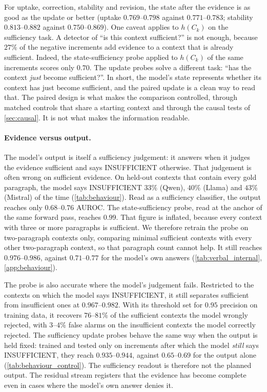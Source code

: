 For uptake, correction, stability and revision, the state after the evidence is as good as the update or better (uptake $0.769$--$0.798$ against $0.771$--$0.783$; stability $0.813$--$0.882$ against $0.750$--$0.869$). One caveat applies to $h(C_k)$ on the sufficiency task. A detector of ``is this context sufficient?'' is not enough, because $27\%$ of the negative increments add evidence to a context that is already sufficient. Indeed, the state-sufficiency probe applied to $h(C_k)$ of the same increments scores only $0.70$. The update probes solve a different task: ``has the context \emph{just} become sufficient?''. In short, the model's state represents whether its context has just become sufficient, and the paired update is a clean way to read that. The paired design is what makes the comparison controlled, through matched controls that share a starting context and through the causal tests of \cref{sec:causal}. It is not what makes the information readable.

\paragraph{Evidence versus output.}
The model's output is itself a sufficiency judgement: it answers when it judges the evidence sufficient and says INSUFFICIENT otherwise. That judgement is often wrong on sufficient evidence. On held-out contexts that contain every gold paragraph, the model says INSUFFICIENT $33\%$ (Qwen), $40\%$ (Llama) and $43\%$ (Mistral) of the time (\cref{tab:behaviour}). Read as a sufficiency classifier, the output reaches only $0.68$--$0.76$ AUROC. The state-sufficiency probe, read at the anchor of the same forward pass, reaches $0.99$. That figure is inflated, because every context with three or more paragraphs is sufficient. We therefore retrain the probe on two-paragraph contexts only, comparing minimal sufficient contexts with every other two-paragraph context, so that paragraph count cannot help. It still reaches $0.976$--$0.986$, against $0.71$--$0.77$ for the model's own answers (\cref{tab:verbal_internal}, \cref{app:behaviour}).

The probe is also accurate where the model's judgement fails. Restricted to the contexts on which the model says INSUFFICIENT, it still separates sufficient from insufficient ones at $0.967$--$0.982$. With its threshold set for $0.95$ precision on training data, it recovers $76$--$81\%$ of the sufficient contexts the model wrongly rejected, with $3$--$4\%$ false alarms on the insufficient contexts the model correctly rejected. The sufficiency update probes behave the same way when the output is held fixed: trained and tested only on increments after which the model \emph{still} says INSUFFICIENT, they reach $0.935$--$0.944$, against $0.65$--$0.69$ for the output alone (\cref{tab:behaviour_control}). The sufficiency readout is therefore not the planned output. The residual stream registers that the evidence has become complete even in cases where the model's own answer denies it.

